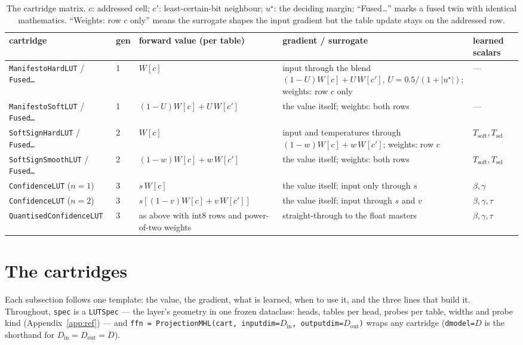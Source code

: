 \documentclass[11pt]{article}
\DeclareRobustCommand{\code}[1]{{\renewcommand{\_}{\textunderscore\allowbreak}\texttt{#1}}}
\begin{document}
\begin{table}[t]
\centering\footnotesize
\setlength{\tabcolsep}{4pt}
\begin{tabularx}{\textwidth}{@{}l l >{\raggedright\arraybackslash}X >{\raggedright\arraybackslash}X l@{}}
\toprule
cartridge & gen & forward value (per table) & gradient / surrogate & learned scalars \\
\midrule
\code{ManifestoHardLUT} / \code{Fused…} & 1 & $W[c]$ & input through the blend $(1-U)W[c]+U\,W[c']$, $U=0.5/(1+|u^\star|)$; weights: row $c$ only & --- \\
\code{ManifestoSoftLUT} / \code{Fused…} & 1 & $(1-U)W[c]+U\,W[c']$ & the value itself; weights: both rows & --- \\
\code{SoftSignHardLUT} / \code{Fused…} & 2 & $W[c]$ & input and temperatures through $(1-w)W[c]+w\,W[c']$; weights: row $c$ & $T_\text{soft},T_\text{sel}$ \\
\code{SoftSignSmoothLUT} / \code{Fused…} & 2 & $(1-w)W[c]+w\,W[c']$ & the value itself; weights: both rows & $T_\text{soft},T_\text{sel}$ \\
\code{ConfidenceLUT} ($n{=}1$) & 3 & $s\,W[c]$ & the value itself; input only through $s$ & $\beta,\gamma$ \\
\code{ConfidenceLUT} ($n{=}2$) & 3 & $s[(1-v)W[c]+v\,W[c']]$ & the value itself; input through $s$ and $v$ & $\beta,\gamma,\tau$ \\
\code{QuantisedConfidenceLUT} & 3 & as above with int8 rows and power-of-two weights & straight-through to the float masters & $\beta,\gamma,\tau$ \\
\bottomrule
\end{tabularx}
\caption{The cartridge matrix. $c$: addressed cell; $c'$: least-certain-bit neighbour; $u^\star$: the
deciding margin; ``Fused…'' marks a fused twin with identical mathematics. ``Weights: row $c$ only''
means the surrogate shapes the input gradient but the table update stays on the addressed row.}
\label{tab:matrix}
\end{table}

\section{The cartridges}
\label{sec:body}

Each subsection follows one template: the value, the gradient, what is learned, when to use it, and the
three lines that build it. Throughout, \code{spec} is a \code{LUTSpec} --- the layer's geometry in one
frozen dataclass: heads, tables per head, probes per table, widths and probe kind
(Appendix~\ref{app:ref}) --- and \code{ffn = ProjectionMHL(cart, input\_dim=$D_\text{in}$,
output\_dim=$D_\text{out}$)} wraps any cartridge (\code{d\_model=}$D$ is the shorthand for
$D_\text{in}=D_\text{out}=D$).
\end{document}
